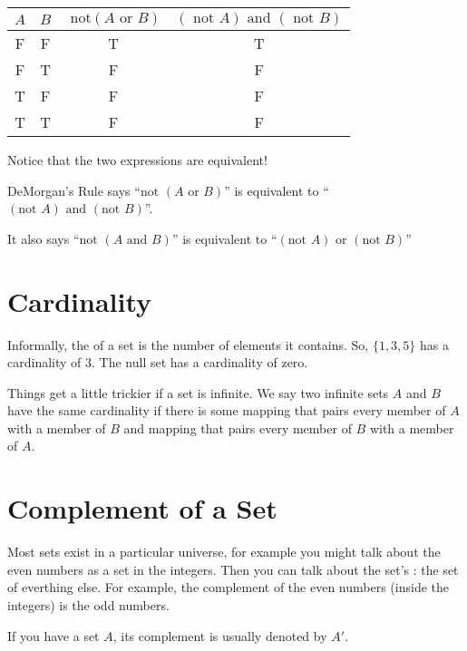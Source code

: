 \begin{Answer}[ref=logic_table]

\begin{tabular}{c | c | c | c}
  $A$ & $B$ & $\text{ not} \left(A \text{ or } B \right)$
  & $\left(\text{ not } A \right) \text{ and } \left(\text{ not } B \right)$ \\
  \hline
  F & F & T & T \\
  F & T & F & F \\
  T & F & F & F \\
  T & T & F & F \\
\end{tabular}

Notice that the two expressions are equivalent!

DeMorgan's Rule says ``$\text{not } \left(A \text{ or } B \right)$'' is
equivalent to ``$\left(\text{not } A \right) \text{ and } \left(\text{not } B
\right)$''.

It also says ``$\text{not } \left(A \text{ and } B \right)$'' is
equivalent to ``$\left(\text{not } A \right) \text{ or } \left(\text{not } B\right)$''

\end{Answer}

\section{Cardinality}

Informally, the  of a set is the number of
elements it contains. So, $\{1,3,5\}$ has a cardinality of 3.  The
null set has a cardinality of zero.

Things get a little trickier if a set is infinite.  We say two
infinite sets $A$ and $B$ have the same cardinality if there is some
mapping that pairs every member of $A$ with a member of $B$ and
mapping that pairs every member of $B$ with a member of $A$.

\section{Complement of a Set}

Most sets exist in a particular universe, for example you might talk
about the even numbers as a set in the integers.  Then you can talk
about the set's : the set of everthing else. For
example, the complement of the even numbers (inside the integers) is
the odd numbers.

If you have a set $A$, its complement is usually denoted by $A'$.

